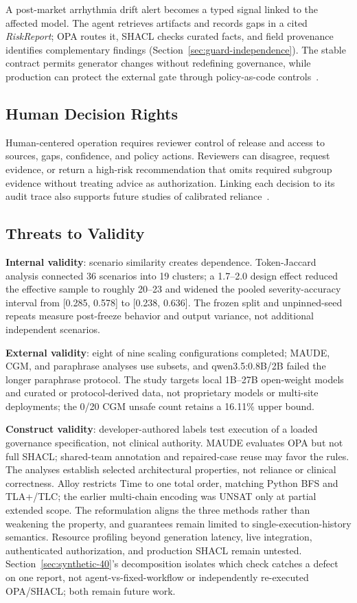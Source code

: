 \documentclass[journal,twoside,web]{ieeecolor}
\begin{document}
A post-market arrhythmia drift alert becomes a typed signal linked to the affected model. The agent retrieves artifacts and records gaps in a cited \textit{RiskReport}; OPA routes it, SHACL checks curated facts, and field provenance identifies complementary findings (Section~\ref{sec:guard-independence}). The stable contract permits generator changes without redefining governance, while production can protect the external gate through policy-as-code controls~\cite{github_environments,opa_cicd}.

\subsection*{Human Decision Rights}

Human-centered operation requires reviewer control of release and access to sources, gaps, confidence, and policy actions. Reviewers can disagree, request evidence, or return a high-risk recommendation that omits required subgroup evidence without treating advice as authorization. Linking each decision to its audit trace also supports future studies of calibrated reliance~\cite{goddard_automation_bias,gaube_do_as_ai_say,tschandl_collaboration}.

\subsection*{Threats to Validity}

\textbf{Internal validity}: scenario similarity creates dependence. Token-Jaccard analysis connected 36 scenarios into 19 clusters; a 1.7--2.0 design effect reduced the effective sample to roughly 20--23 and widened the pooled severity-accuracy interval from [0.285, 0.578] to [0.238, 0.636]. The frozen split and unpinned-seed repeats measure post-freeze behavior and output variance, not additional independent scenarios.

\textbf{External validity}: eight of nine scaling configurations completed; MAUDE, CGM, and paraphrase analyses use subsets, and qwen3.5:0.8B/2B failed the longer paraphrase protocol. The study targets local 1B--27B open-weight models and curated or protocol-derived data, not proprietary models or multi-site deployments; the 0/20 CGM unsafe count retains a 16.11\% upper bound.

\textbf{Construct validity}: developer-authored labels test execution of a loaded governance specification, not clinical authority. MAUDE evaluates OPA but not full SHACL; shared-team annotation and repaired-case reuse may favor the rules. The analyses establish selected architectural properties, not reliance or clinical correctness. Alloy restricts Time to one total order, matching Python BFS and TLA+/TLC; the earlier multi-chain encoding was UNSAT only at partial extended scope. The reformulation aligns the three methods rather than weakening the property, and guarantees remain limited to single-execution-history semantics. Resource profiling beyond generation latency, live integration, authenticated authorization, and production SHACL remain untested. Section~\ref{sec:synthetic-40}'s decomposition isolates which check catches a defect on one report, not agent-vs-fixed-workflow or independently re-executed OPA/SHACL; both remain future work.
\end{document}
